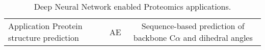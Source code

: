 \begin{table}[h!]
\centering
\begin{tabular}{||l|c|c||}
    \hline
    Application 
    Preotein structure prediction & AE & Sequence-based prediction of backbone C$\alpha$ and dihedral angles 
    \hline
\end{tabular}
\caption{Deep Neural Network enabled Proteomics applications.}
\label{tab:PS-DNN}
\end{table}
